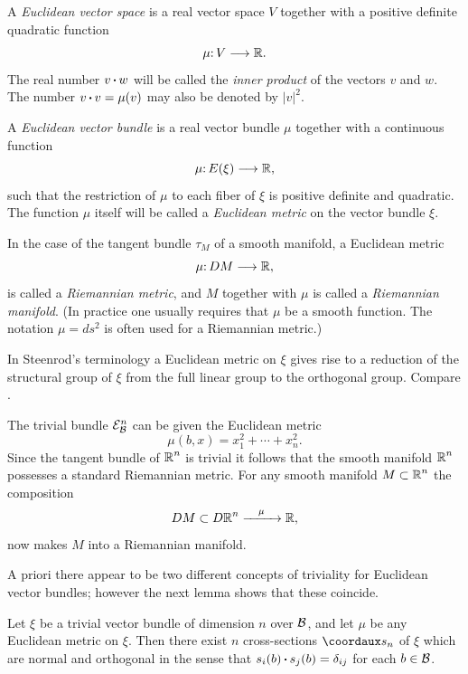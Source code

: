 \begin{definition}\label{def:2-5}
	A \textit{Euclidean vector space} is a real vector space $V$
	together with a positive definite quadratic function
	\[\mu\mathpunct{:}V\longrightarrow \boldsymbol{\mathbb{R}}. \]
	The real number $v \operatorname{\boldsymbol{\cdot}} w$ will be called the \textit{inner product} of the vectors $v$
	and $w$. The number $v\operatorname{\boldsymbol{\cdot}} v =\mu(v)$ may also be denoted by $|v|^2$.
\end{definition}


\begin{definition}\label{def:2-6}
	A \textit{Euclidean vector bundle} is a real vector bundle $\mu$
	together with a continuous function
\[\mu\mathpunct{:}E(\xi) \longrightarrow \boldsymbol{\mathbb{R}},\]
	such that the restriction of $\mu$ to each fiber of $\xi$ is positive definite and
	quadratic. The function $\mu$ itself will be called a \textit{Euclidean metric} on
	the vector bundle $\xi$.
	
	In the case of the tangent bundle $\tau_M$ of a smooth manifold, a 
	Euclidean metric
	\[\mu\mathpunct{:}DM \longrightarrow \boldsymbol{\mathbb{R}},\]
	is called a \textit{Riemannian metric}, and $M$ together with $\mu$ is called a 
	\textit{Riemannian manifold}. (In practice one usually requires that $\mu$ be a smooth
	function. The notation  $\mu=
	ds^2$ is often used for a Riemannian metric.)
\end{definition}
\begin{note}
	In Steenrod's terminology a Euclidean metric on $\xi$ gives rise
	to a reduction of the structural group of $\xi$ from the full linear group to
	the orthogonal group. Compare \cite[\S 12.9]{18}.
\end{note}

\begin{example}\label{ex-0-0}
	The trivial bundle $\mathcal{E}^n_{\mathcal{B}}$ can be given the Euclidean metric
	\[\mu(b, x)=x_{1}^{2}+\cdots+x_{n}^{2}.\]
	Since the tangent bundle of $\boldsymbol{\mathbb{R}}^n$ is trivial it follows that the smooth 
	manifold $\boldsymbol{\mathbb{R}}^n$ possesses a standard Riemannian metric. For any smooth 
	manifold $M \subset \boldsymbol{\mathbb{R}}^n$ the composition
\[DM\subset D\boldsymbol{\mathbb{R}}^n\xrightarrow{\quad\mu\quad} \boldsymbol{\mathbb{R}}, \]
now makes $M$ into a Riemannian manifold.
\end{example}
A priori there appear to be two different concepts of triviality for
Euclidean vector bundles; however the next lemma shows that these coincide.

\begin{lemma}\label{lem-2-4}
	Let $\xi$ be a trivial vector bundle of dimension $n$
	over $\mathcal{B}$, and let $\mu$ be any Euclidean metric on $\xi$. Then there
	exist $n$ cross-sections $\coord{s_n}$ of $\xi$ which are normal and
	orthogonal in the sense that
	$s_i(b)\operatorname{\boldsymbol{\cdot}} s_j(b)=\delta_{ij}$
	for each $b\in\mathcal{B}$.
\end{lemma}

